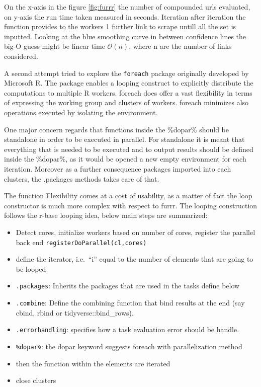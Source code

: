 \documentclass[
  12pt,
  a4paper,
  oneside]{book}
\providecommand{\tightlist}{%
  \setlength{\itemsep}{0pt}\setlength{\parskip}{0pt}}
\theoremstyle{definition}
\theoremstyle{definition}
\theoremstyle{definition}
\theoremstyle{remark}
\begin{document}
On the x-axis in the figure \ref{fig:furrr} the number of compounded urls evaluated, on y-axis the run time taken measured in seconds. Iteration after iteration the function provides to the workers 1 further link to scrape untill all the set is inputted. Looking at the blue smoothing curve in between confidence lines the big-O guess might be linear time \(\mathcal{O}(n)\), where n are the number of links considered.

A second attempt tried to explore the \texttt{foreach} package \citep{foreach} originally developed by Microsoft R. The package enables a looping construct to explicitly distribute the computations to multiple R workers. foreach does offer a vast flexibility in terms of expressing the working group and clusters of workers. foreach minimizes also operations executed by isolating the environment.

One major concern regards that functions inside the \%dopar\% should be standalone in order to be executed in parallel. For standalone it is meant that everything that is needed to be executed and to output results should be defined inside the \%dopar\%, as it would be opened a new empty environment for each iteration. Moreover as a further consequence packages imported into each clusters, the .packages methods takes care of that.

The function Flexibility comes at a cost of usability, as a matter of fact the loop constructor is much more complex with respect to furrr.
The looping construction follows the r-base looping idea, below main steps are summarized:

\begin{itemize}
\tightlist
\item
  Detect cores, initialize workers based on number of cores, register the parallel back end \texttt{registerDoParallel(cl,cores)}
\item
  define the iterator, i.e.~``i'' equal to the number of elements that are going to be looped
\item
  \texttt{.packages}: Inherits the packages that are used in the tasks define below
\item
  \texttt{.combine}: Define the combining function that bind results at the end (say cbind, rbind or tidyverse::bind\_rows).
\item
  \texttt{.errorhandling}: specifies how a task evaluation error should be handle.
\item
  \texttt{\%dopar\%}: the dopar keyword suggests foreach with parallelization method
\item
  then the function within the elements are iterated
\item
  close clusters
\end{itemize}
\end{document}
